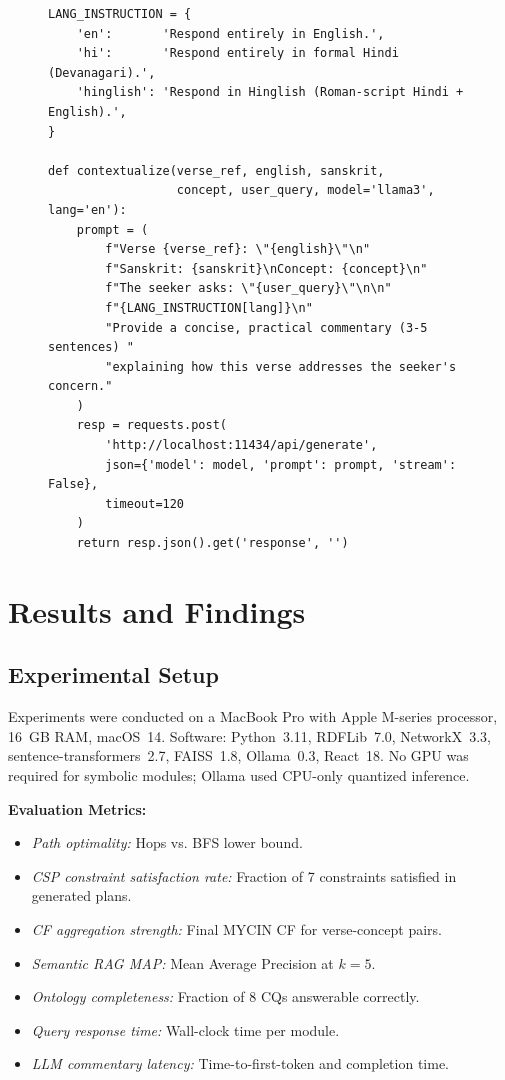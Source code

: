 \documentclass[conference]{IEEEtran}
\begin{document}
\begin{figure}[!t]
\begin{lstlisting}[language=Python3, caption={Ollama contextual commentary generation}]
LANG_INSTRUCTION = {
    'en':       'Respond entirely in English.',
    'hi':       'Respond entirely in formal Hindi (Devanagari).',
    'hinglish': 'Respond in Hinglish (Roman-script Hindi + English).',
}

def contextualize(verse_ref, english, sanskrit,
                  concept, user_query, model='llama3', lang='en'):
    prompt = (
        f"Verse {verse_ref}: \"{english}\"\n"
        f"Sanskrit: {sanskrit}\nConcept: {concept}\n"
        f"The seeker asks: \"{user_query}\"\n\n"
        f"{LANG_INSTRUCTION[lang]}\n"
        "Provide a concise, practical commentary (3-5 sentences) "
        "explaining how this verse addresses the seeker's concern."
    )
    resp = requests.post(
        'http://localhost:11434/api/generate',
        json={'model': model, 'prompt': prompt, 'stream': False},
        timeout=120
    )
    return resp.json().get('response', '')
\end{lstlisting}
\end{figure}

\clearpage
\section{Results and Findings}

\subsection{Experimental Setup}

Experiments were conducted on a MacBook Pro with Apple M-series processor,
16~GB RAM, macOS~14. Software: Python~3.11, RDFLib~7.0, NetworkX~3.3,
sentence-transformers~2.7, FAISS~1.8, Ollama~0.3, React~18. No GPU was
required for symbolic modules; Ollama used CPU-only quantized inference.

\textbf{Evaluation Metrics:}
\begin{itemize}[leftmargin=*]
  \item \textit{Path optimality:} Hops vs. BFS lower bound.
  \item \textit{CSP constraint satisfaction rate:} Fraction of 7 constraints
        satisfied in generated plans.
  \item \textit{CF aggregation strength:} Final MYCIN CF for verse-concept pairs.
  \item \textit{Semantic RAG MAP:} Mean Average Precision at $k = 5$.
  \item \textit{Ontology completeness:} Fraction of 8 CQs answerable correctly.
  \item \textit{Query response time:} Wall-clock time per module.
  \item \textit{LLM commentary latency:} Time-to-first-token and completion time.
\end{itemize}
\end{document}

